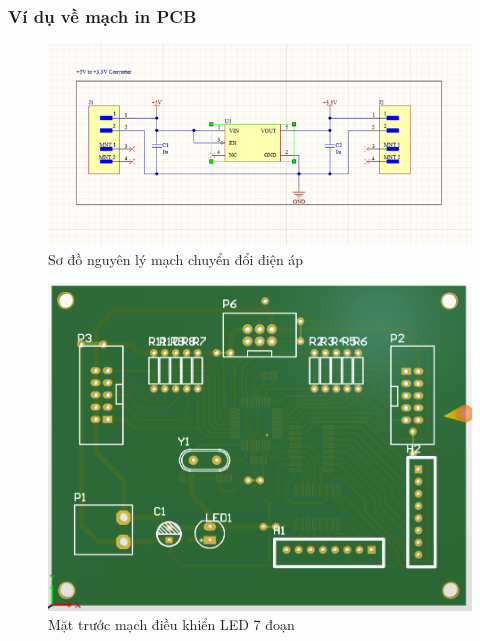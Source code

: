 \documentclass{article}
\begin{document}
\subsubsection{Ví dụ về mạch in PCB}
\begin{figure}[H]
    \centering
    \includegraphics[width=1\textwidth]{image/sch1.png}
    \caption{Sơ đồ nguyên lý mạch chuyển đổi điện áp}
    \label{fig:sodonguyenly}
\end{figure}
\begin{figure}[H]
    \centering
    \includegraphics[width=1\textwidth]{image/pcb1.png}
    \caption{Mặt trước mạch điều khiển LED 7 đoạn}
    \label{fig:hbridge}
\end{figure}
\end{document}
